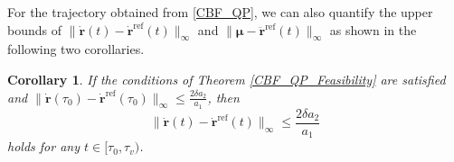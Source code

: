 \documentclass[journal,10pt]{IEEEtran}
\newtheorem{corollary}{\bfseries Corollary}%
\newcommand{\vect}[1]{\boldsymbol{\mathbf{#1}}}
\begin{document}
For the trajectory obtained from \eqref{CBF_QP}, we can also quantify the upper bounds of $\|\dot{\vect{r}}(t) -\dot{\vect{r}}^{\text{ref}}(t)\|_{\infty}$ and $\|\vect{\mu} - \ddot{\vect{r}}^{\text{ref}}(t)\|_{\infty}$ as shown in the following two corollaries.

\begin{corollary} \label{bounded_vel_corollary}
If the conditions of Theorem \ref{CBF_QP_Feasibility} are satisfied and $\|\dot{\vect{r}}(\tau_0) -\dot{\vect{r}}^{\text{ref}}(\tau_0)\|_{\infty} \leq \frac{2\delta a_2}{a_1}$, then
\begin{equation} \label{cbf_vel_bounds}
    \|\dot{\vect{r}}(t) -\dot{\vect{r}}^{\text{ref}}(t)\|_{\infty} \leq \frac{2\delta a_2}{a_1}
\end{equation}
holds for any $t\in[\tau_0,\tau_v)$. 
\end{corollary}
\end{document}
